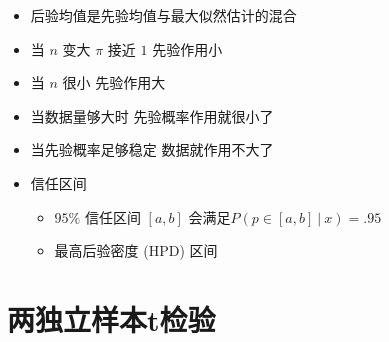 \documentclass[]{book}
\providecommand{\tightlist}{%
  \setlength{\itemsep}{0pt}\setlength{\parskip}{0pt}}
\begin{document}
\begin{itemize}
\tightlist
\item
  后验均值是先验均值与最大似然估计的混合
\item
  当 \(n\) 变大 \(\pi\) 接近 \(1\) 先验作用小
\item
  当 \(n\) 很小 先验作用大
\item
  当数据量够大时 先验概率作用就很小了
\item
  当先验概率足够稳定 数据就作用不大了
\item
  信任区间

  \begin{itemize}
  \tightlist
  \item
    \(95\%\) 信任区间 \([a, b]\) 会满足\(P(p \in [a, b] ~|~ x) = .95\)
  \item
    最高后验密度 (HPD) 区间
  \end{itemize}
\end{itemize}

\hypertarget{t}{%
\section{两独立样本t检验}\label{t}}
\end{document}
